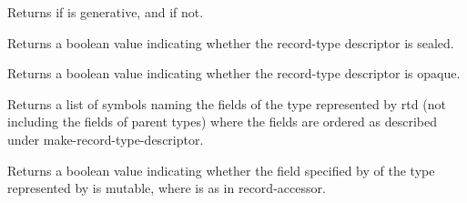 \begin{entry}{%
}
   
Returns \schtrue{} if  is generative, and \schfalse{} if not.
\end{entry}

\begin{entry}{%
}

Returns a boolean value indicating whether the record-type descriptor is
sealed.
\end{entry}

\begin{entry}{%
}
   
Returns a boolean value indicating whether the record-type descriptor is
opaque.
\end{entry}

\begin{entry}{%
}
   
Returns a list of symbols naming the fields of the type represented by rtd
(not including the fields of parent types) where the fields are ordered as
described under {\cf make-record-type-descriptor}.
\end{entry}

\begin{entry}{%
}
   
Returns a boolean value indicating whether the field specified by
 of the type represented by  is mutable, where 
is as in {\cf record-accessor}.
\end{entry}

